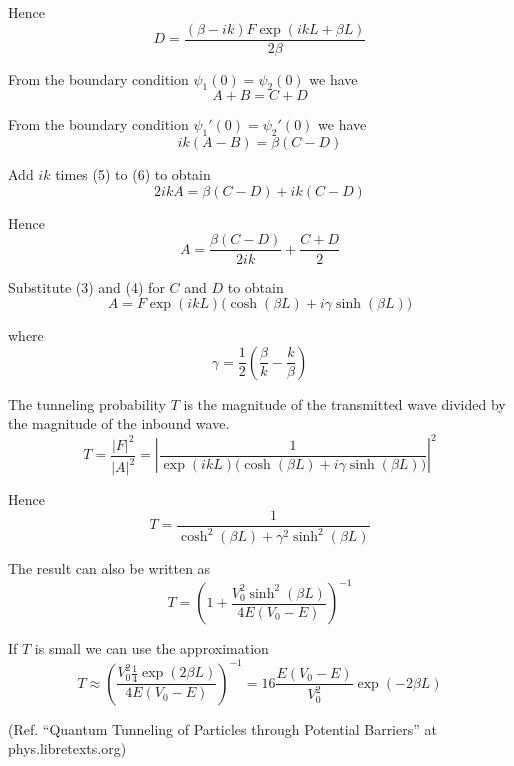 Hence
\begin{equation*}
D=\frac{(\beta-ik)F\exp(ikL+\beta L)}{2\beta}
\tag{4}
\end{equation*}

From the boundary condition $\psi_1(0)=\psi_2(0)$ we have
\begin{equation*}
A+B=C+D
\tag{5}
\end{equation*}

From the boundary condition $\psi_1'(0)=\psi_2'(0)$ we have
\begin{equation*}
ik(A-B)=\beta(C-D)
\tag{6}
\end{equation*}

Add $ik$ times (5) to (6) to obtain
\begin{equation*}
2ikA=\beta(C-D)+ik(C-D)
\end{equation*}

Hence
\begin{equation*}
A=\frac{\beta(C-D)}{2ik}+\frac{C+D}{2}
\end{equation*}

Substitute (3) and (4) for $C$ and $D$ to obtain
\begin{equation*}
A = F\exp(ikL)\bigl(\cosh(\beta L)+i\gamma\sinh(\beta L)\bigr)
\tag{7}
\end{equation*}

where
\begin{equation*}
\gamma=\frac{1}{2}\left(\frac{\beta}{k}-\frac{k}{\beta}\right)
\end{equation*}

The tunneling probability $T$ is the magnitude of the transmitted
wave divided by the magnitude of the inbound wave.
\begin{equation*}
T=\frac{|F|^2}{|A|^2}
=\left|\frac{1}{\exp(ikL)\bigl(\cosh(\beta L)+i\gamma\sinh(\beta L)\bigr)}\right|^2
\end{equation*}

Hence
\begin{equation*}
T=\frac{1}{\cosh^2(\beta L)+\gamma^2\sinh^2(\beta L)}
\tag{8}
\end{equation*}

The result can also be written as
\begin{equation*}
T=\left(1+\frac{V_0^2\sinh^2(\beta L)}{4E(V_0-E)}\right)^{-1}
\tag{9}
\end{equation*}

If $T$ is small we can use the approximation
\begin{equation*}
T\approx\left(\frac{V_0^2\frac{1}{4}\exp(2\beta L)}{4E(V_0-E)}\right)^{-1}
=16\frac{E(V_0-E)}{V_0^2}\exp(-2\beta L)
\end{equation*}

(Ref. ``Quantum Tunneling of Particles through Potential Barriers''
at phys.libretexts.org)


